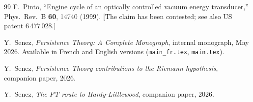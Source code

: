 \documentclass[11pt,a4paper]{article}
\begin{document}
\begin{thebibliography}{99}
F.~Pinto, ``Engine cycle of an optically controlled vacuum energy transducer,''
Phys.\ Rev.\ B \textbf{60}, 14740 (1999). [The claim has been contested; see also
US patent 6\,477\,028.]

Y.~Senez, \emph{Persistence Theory: A Complete Monograph}, internal monograph, May 2026.
Available in French and English versions (\texttt{main\_fr.tex}, \texttt{main.tex}).

Y.~Senez, \emph{Persistence Theory contributions to the Riemann hypothesis},
companion paper, 2026.

Y.~Senez, \emph{The PT route to Hardy-Littlewood}, companion paper, 2026.

\end{thebibliography}
\end{document}
